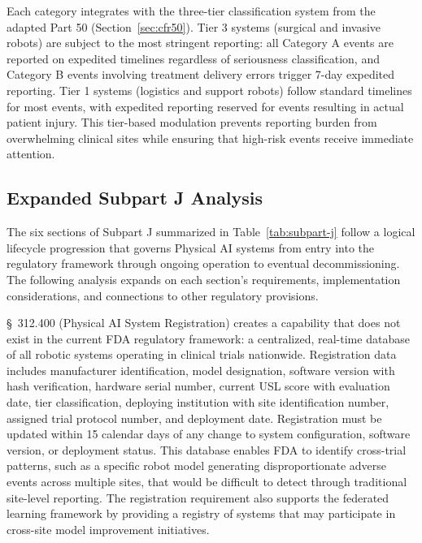 Each category integrates with the three-tier classification system from the
adapted Part 50 (Section~\ref{sec:cfr50}). Tier 3 systems (surgical and
invasive robots) are subject to the most stringent reporting: all Category A
events are reported on expedited timelines regardless of seriousness
classification, and Category B events involving treatment delivery errors
trigger 7-day expedited reporting. Tier 1 systems (logistics and support
robots) follow standard timelines for most events, with expedited reporting
reserved for events resulting in actual patient injury. This tier-based
modulation prevents reporting burden from overwhelming clinical sites while
ensuring that high-risk events receive immediate attention.

\subsection{Expanded Subpart J Analysis}
\label{subsec:cfr312-subpart-j-expanded}

The six sections of Subpart J summarized in Table~\ref{tab:subpart-j} follow a
logical lifecycle progression that governs Physical AI systems from entry into
the regulatory framework through ongoing operation to eventual
decommissioning. The following analysis expands on each section's requirements,
implementation considerations, and connections to other regulatory provisions.

\S~312.400 (Physical AI System Registration) creates a capability that does
not exist in the current FDA regulatory framework: a centralized, real-time
database of all robotic systems operating in clinical trials nationwide.
Registration data includes manufacturer identification, model designation,
software version with hash verification, hardware serial number, current USL
score with evaluation date, tier classification, deploying institution with
site identification number, assigned trial protocol number, and deployment
date. Registration must be updated within 15 calendar days of any change to
system configuration, software version, or deployment status. This database
enables FDA to identify cross-trial patterns, such as a specific robot model
generating disproportionate adverse events across multiple sites, that would
be difficult to detect through traditional site-level reporting. The
registration requirement also supports the federated learning framework
\cite{fl-paper} by providing a registry of systems that may participate in
cross-site model improvement initiatives.

